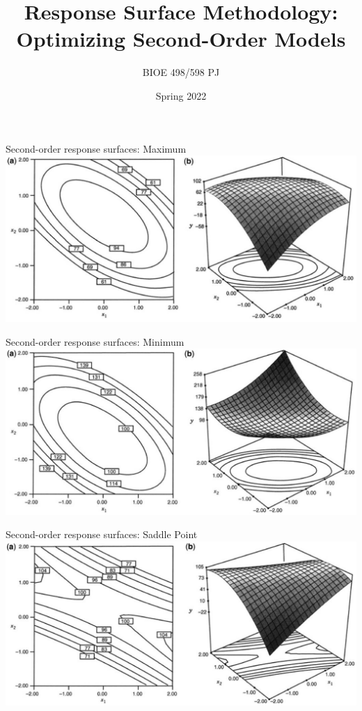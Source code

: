 \documentclass[10pt]{beamer}
\title{Response Surface Methodology:\\Optimizing Second-Order Models}
\author{BIOE 498/598 PJ}
\date{Spring 2022}
\begin{document}
\frame{\titlepage}

\begin{frame}{Second-order response surfaces: Maximum}
	\includegraphics[width=\textwidth]{figures/rsm_maximum}
\end{frame}

\begin{frame}{Second-order response surfaces: Minimum}
	\includegraphics[width=\textwidth]{figures/rsm_minimum}
\end{frame}

\begin{frame}{Second-order response surfaces: Saddle Point}
	\includegraphics[width=\textwidth]{figures/rsm_saddle}
\end{frame}
\end{document}
